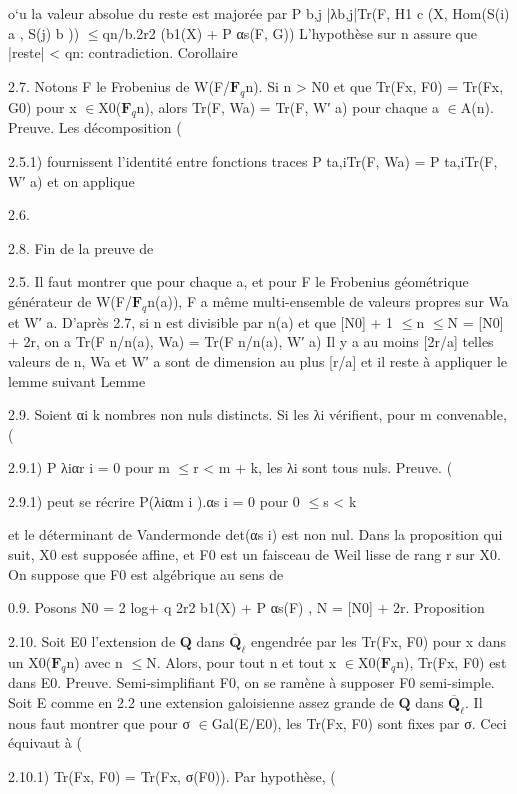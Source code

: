 \documentclass[11pt]{article}
\begin{document}
o`u la valeur absolue du reste est majorée par P b,j |λb,j|Tr(F, H1 c (X, Hom(S(i) a , S(j) b )) \(\le\)qn/b.2r2 (b1(X) + P αs(F, G)) L’hypothèse sur n assure que |reste| < qn: contradiction. Corollaire 

2.7. Notons F le Frobenius de W(F/\(\mathbf F_q\)n). Si n > N0 et que Tr(Fx, F0) = Tr(Fx, G0) pour x \(\in\)X0(\(\mathbf F_q\)n), alors Tr(F, Wa) = Tr(F, W′ a) pour chaque a \(\in\)A(n). Preuve. Les décomposition (

2.5.1) fournissent l’identité entre fonctions traces P ta,iTr(F, Wa) = P ta,iTr(F, W′ a) et on applique 

2.6. 

2.8. Fin de la preuve de 

2.5. Il faut montrer que pour chaque a, et pour F le Frobenius géométrique générateur de W(F/\(\mathbf F_q\)n(a)), F a même multi-ensemble de valeurs propres sur Wa et W′ a. D’après 2.7, si n est divisible par n(a) et que [N0] + 1 \(\le\)n \(\le\)N = [N0] + 2r, on a Tr(F n/n(a), Wa) = Tr(F n/n(a), W′ a) Il y a au moins [2r/a] telles valeurs de n, Wa et W′ a sont de dimension au plus [r/a] et il reste à appliquer le lemme suivant Lemme 

2.9. Soient αi k nombres non nuls distincts. Si les λi vérifient, pour m convenable, (

2.9.1) P λiαr i = 0 pour m \(\le\)r < m + k, les λi sont tous nuls. Preuve. (

2.9.1) peut se récrire P(λiαm i ).αs i = 0 pour 0 \(\le\)s < k

et le déterminant de Vandermonde det(αs i) est non nul. Dans la proposition qui suit, X0 est supposée affine, et F0 est un faisceau de Weil lisse de rang r sur X0. On suppose que F0 est algébrique au sens de 

0.9. Posons N0 = 2 log+ q 2r2 b1(X) + P αs(F)  , N = [N0] + 2r. Proposition 

2.10. Soit E0 l’extension de \(\mathbf Q\) dans \(\overline{\mathbf Q}_\ell\) engendrée par les Tr(Fx, F0) pour x dans un X0(\(\mathbf F_q\)n) avec n \(\le\)N. Alors, pour tout n et tout x \(\in\)X0(\(\mathbf F_q\)n), Tr(Fx, F0) est dans E0. Preuve. Semi-simplifiant F0, on se ramène à supposer F0 semi-simple. Soit E comme en 2.2 une extension galoisienne assez grande de \(\mathbf Q\) dans \(\overline{\mathbf Q}_\ell\). Il nous faut montrer que pour σ \(\in\)Gal(E/E0), les Tr(Fx, F0) sont fixes par σ. Ceci équivaut à (

2.10.1) Tr(Fx, F0) = Tr(Fx, σ(F0)). Par hypothèse, (
\end{document}
